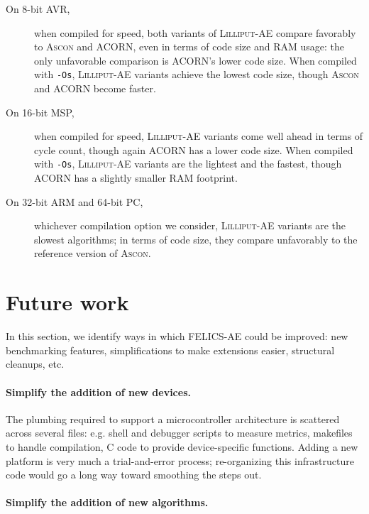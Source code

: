 \documentclass{article}
\begin{document}
\begin{description}
\item[On 8-bit AVR,] when compiled for speed, both variants of
  \textsc{Lilliput-AE} compare favorably to \textsc{Ascon} and ACORN,
  even in terms of code size and RAM usage: the only unfavorable
  comparison is ACORN's lower code size.  When compiled with
  \texttt{-Os}, \textsc{Lilliput-AE} variants achieve the lowest code
  size, though \textsc{Ascon} and ACORN become faster.

\item[On 16-bit MSP,] when compiled for speed, \textsc{Lilliput-AE}
  variants come well ahead in terms of cycle count, though again ACORN
  has a lower code size.  When compiled with \texttt{-Os},
  \textsc{Lilliput-AE} variants are the lightest and the fastest,
  though ACORN has a slightly smaller RAM footprint.

\item[On 32-bit ARM and 64-bit PC,] whichever compilation option we
  consider, \textsc{Lilliput-AE} variants are the slowest algorithms;
  in terms of code size, they compare unfavorably to the reference
  version of \textsc{Ascon}.
\end{description}

\section{Future work}
\label{sec:future}

In this section, we identify ways in which FELICS-AE could be
improved: new benchmarking features, simplifications to make
extensions easier, structural cleanups, etc.

\paragraph{Simplify the addition of new devices.}

The plumbing required to support a microcontroller architecture is
scattered across several files: e.g. shell and debugger scripts to
measure metrics, makefiles to handle compilation, C code to provide
device-specific functions.  Adding a new platform is very much a
trial-and-error process; re-organizing this infrastructure code would
go a long way toward smoothing the steps out.

\paragraph{Simplify the addition of new algorithms.}
\end{document}

